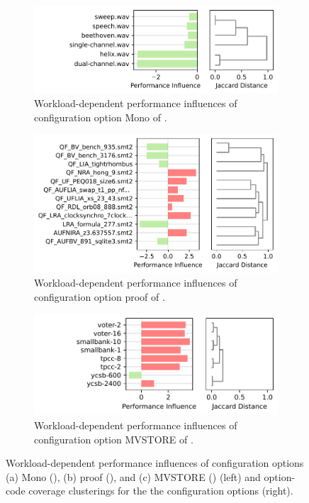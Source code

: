 {{{\begin{figure}
	\begin{subfigure}{\linewidth}
		\hfill\includegraphics[width=0.98\linewidth]{images/jump3r.sens.pdf}
		\caption{Workload-dependent performance influences of configuration option \textsf{Mono} of \jumper.}
		\label{fig:mono_jump3r}
	\end{subfigure}
	\begin{subfigure}{\linewidth}
		\vspace{2em}
		\hfill\includegraphics[width=\linewidth]{images/z3.sens.pdf}
		\caption{Workload-dependent performance influences of configuration option \textsf{proof} of \zdrei.}
		\label{fig:proof_z3}
	\end{subfigure}
	\begin{subfigure}{\linewidth}
		
		\hfill\includegraphics[width=0.925\linewidth]{images/h2.sens.pdf}
		\caption{Workload-dependent performance influences of configuration option \textsf{MVSTORE} of \htwo.}
		\label{fig:mvstore_h2}
	\end{subfigure}
	\caption{Workload-dependent performance influences of configuration options (a) \textsf{Mono} (\jumper), (b) \textsf{proof} (\zdrei), and (c) \textsf{MVSTORE} (\htwo) (left) and option-code coverage clusterings for the the configuration options (right).}
\end{figure}

}}}
